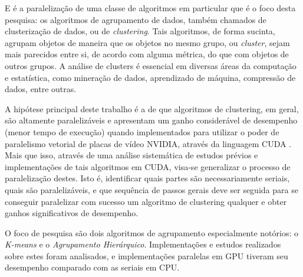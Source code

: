 \documentclass[12pt,
openright, 
oneside, %
a4paper,    %
brazil]{facom-ufu-abntex2}
\def\qntAlgrtm{dois}
\begin{document}

E é a paralelização de uma classe de algoritmos em particular que é o foco desta pesquisa: os algoritmos de agrupamento de dados, também chamados de clusterização de dados, ou de \textit{clustering}. Tais algoritmos, de forma sucinta, agrupam objetos de maneira que os objetos no mesmo grupo, ou \textit{cluster}, sejam mais parecidos entre si, de acordo com alguma métrica, do que com objetos de outros grupos. A análise de clusters é essencial em diversas áreas da computação e estatística, como mineração de dados, aprendizado de máquina, compressão de dados, entre outras.


A hipótese principal deste trabalho é a de que algoritmos de clustering, em geral, são altamente paralelizáveis e apresentam um ganho considerável de desempenho (menor tempo de execução) quando implementados para utilizar o poder de paralelismo vetorial de placas de vídeo NVIDIA, através da linguagem CUDA \cite{CUDAZone}. Mais que isso, através de uma análise sistemática de estudos prévios e implementações de tais algoritmos em CUDA, visa-se generalizar o processo de paralelização destes. Isto é, identificar quais partes são necessariamente seriais, quais são paralelizáveis, e que sequência de passos gerais deve ser seguida para se conseguir paralelizar com sucesso um algoritmo de clustering qualquer e obter ganhos significativos de desempenho.



O foco de pesquisa são \qntAlgrtm{} algoritmos de agrupamento especialmente notórios: o \textit{K-means} \cite{GPU-accelerated-K-Means} e o \textit{Agrupamento Hierárquico}. Implementações e estudos realizados sobre estes foram analisados, e implementações paralelas em GPU tiveram seu desempenho comparado com as seriais em CPU.
\end{document}
